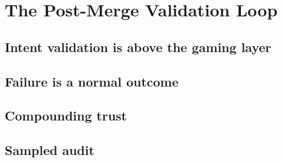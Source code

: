 \section{The Post-Merge Validation Loop}
\label{sec:validation}


\subsection{Intent validation is above the gaming layer}

\subsection{Failure is a normal outcome}

\subsection{Compounding trust}

\subsection{Sampled audit}
